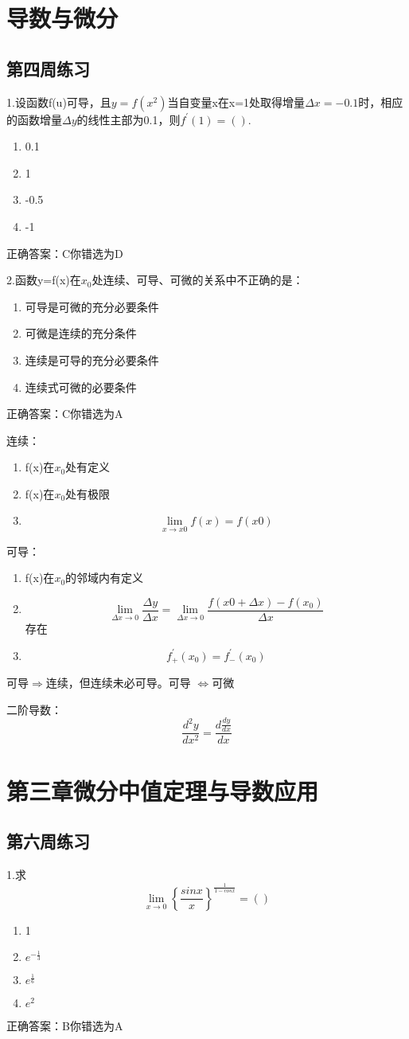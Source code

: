 \documentclass[fleqn]{article}
\begin{document}
\begin{flushleft}
\section{导数与微分}
\subsection{第四周练习}
1.设函数f(u)可导，且$y=f(x^2)$当自变量x在x=1处取得增量$\Delta x=-0.1$时，相应的函数增量$\Delta y$的线性主部为0.1，则$f^{'}(1)=().$
\begin{enumerate}
\item 0.1
\item 1
\item -0.5
\item -1
\end{enumerate}
正确答案：C你错选为D

2.函数y=f(x)在$x_0$处连续、可导、可微的关系中不正确的是：
\begin{enumerate}
\item 可导是可微的充分必要条件
\item 可微是连续的充分条件
\item 连续是可导的充分必要条件
\item 连续式可微的必要条件
\end{enumerate}
正确答案：C你错选为A
\par
连续：
\begin{enumerate}
\item f(x)在$x_0$处有定义
\item f(x)在$x_0$处有极限
\item \[\lim_{x\to x0}f(x)=f(x0)\]
\end{enumerate}
可导：
\begin{enumerate}
\item f(x)在$x_0$的邻域内有定义
\item \[\lim_{\Delta x\to 0}\frac{\Delta y}{\Delta x}=\lim_{\Delta x\to 0}\frac{f(x0+\Delta x)-f(x_0)}{\Delta x}\]存在
\item \[f_{+}^{'}(x_0)=f_{-}^{'}(x_0)\]
\end{enumerate}
可导$\Longrightarrow$连续，但连续未必可导。可导
$\Longleftrightarrow$可微

二阶导数：\[\frac{d^2y}{dx^2}=\frac{d\frac{dy}{dx}}{dx}\]

\section{第三章微分中值定理与导数应用}
\subsection{第六周练习}
1.求\[\lim_{x\to 0}\left\lbrace\frac{sinx}{x}\right\rbrace^\frac{1}{1-cosx}=()\]
\begin{enumerate}
\item 1
\item $e^{-\frac{1}{3}}$
\item $e^{\frac{1}{6}}$
\item $e^2$
\end{enumerate}
正确答案：B你错选为A


\end{flushleft}
\end{document}
